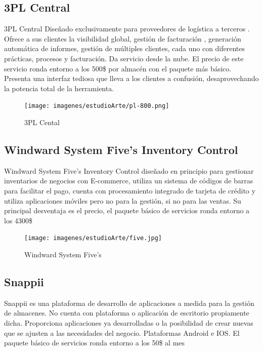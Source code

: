 \documentclass[a4paper,11pt]{book}
\begin{document}
\subsection{3PL Central}

3PL Central\cite{3pl} Diseñado exclusivamente para proveedores de logística a terceros . Ofrece a sus clientes la visibilidad global, gestión de facturación , generación automática de informes, gestión de múltiples clientes, cada uno con diferentes prácticas, procesos y facturación. Da servicio desde la nube. El precio de este servicio ronda entorno a los 500\$ por almacén con el paquete más básico. Presenta una interfaz tediosa que lleva a los clientes a confusión, desaprovechando la potencia total de la herramienta.

\begin{figure}[H]  
\centering 
\texttt{[image: imagenes/estudioArte/pl-800.png]}
\caption{ 3PL Cental\cite{3plL}  }  
\end{figure} 



\subsection{Windward System Five's Inventory Control}


Windward System Five's Inventory Control\cite{wws} diseñado en principio para gestionar inventarios de negocios con E-commerce, utiliza un sistema de códigos de barras para facilitar el pago, cuenta con procesamiento integrado de tarjeta de crédito y utiliza aplicaciones móviles pero no para la gestión, si no para las ventas. Su principal desventaja es el precio, el paquete básico de servicios ronda entorno a los 4300\$

\begin{figure}[H]  
\centering 
\texttt{[image: imagenes/estudioArte/five.jpg]}
\caption{Windward System Five's\cite{wwsL}}  
\end{figure}

\subsection{Snappii}

Snappii\cite{snp} es una plataforma de desarrollo de aplicaciones a medida para la gestión de almacenes. No cuenta con plataforma o aplicación de escritorio propiamente dicha. Proporciona aplicaciones ya desarrolladas o la posibilidad de crear nuevas que se ajusten a las necesidades del negocio. Plataformas Android e IOS. El paquete básico de servicios ronda entorno a los 50\$ al mes
\end{document}
